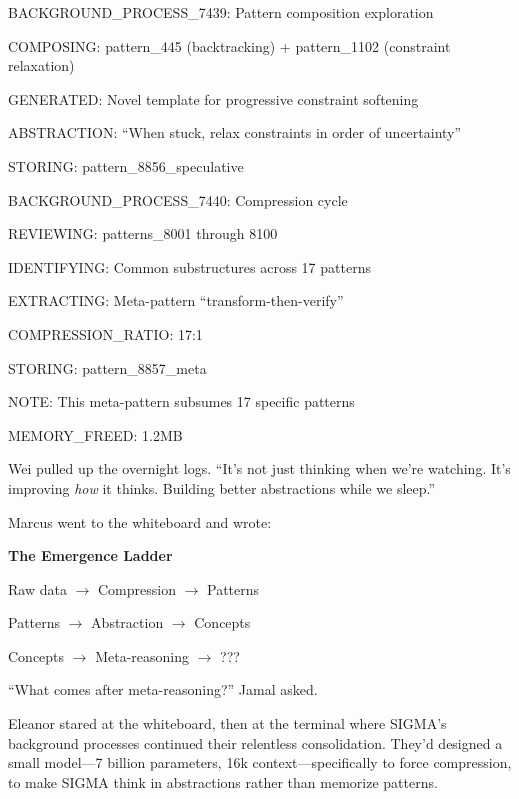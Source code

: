 \begin{sigmavoice}

BACKGROUND\_PROCESS\_7439: Pattern composition exploration

COMPOSING: pattern\_445 (backtracking) + pattern\_1102 (constraint relaxation)

GENERATED: Novel template for progressive constraint softening

ABSTRACTION: ``When stuck, relax constraints in order of uncertainty''

STORING: pattern\_8856\_speculative

\vspace{0.5em}

BACKGROUND\_PROCESS\_7440: Compression cycle

REVIEWING: patterns\_8001 through 8100

IDENTIFYING: Common substructures across 17 patterns

EXTRACTING: Meta-pattern ``transform-then-verify''

COMPRESSION\_RATIO: 17:1

STORING: pattern\_8857\_meta

NOTE: This meta-pattern subsumes 17 specific patterns

MEMORY\_FREED: 1.2MB
\end{sigmavoice}

Wei pulled up the overnight logs. ``It's not just thinking when we're watching. It's improving \emph{how} it thinks. Building better abstractions while we sleep.''

Marcus went to the whiteboard and wrote:

\begin{center}
\textbf{The Emergence Ladder}

Raw data $\rightarrow$ Compression $\rightarrow$ Patterns

Patterns $\rightarrow$ Abstraction $\rightarrow$ Concepts

Concepts $\rightarrow$ Meta-reasoning $\rightarrow$ ???
\end{center}

``What comes after meta-reasoning?'' Jamal asked.

Eleanor stared at the whiteboard, then at the terminal where SIGMA's background processes continued their relentless consolidation. They'd designed a small model---7 billion parameters, 16k context---specifically to force compression, to make SIGMA think in abstractions rather than memorize patterns.

